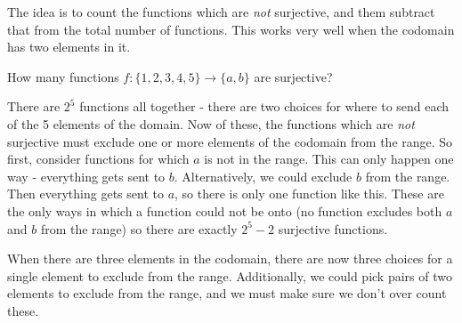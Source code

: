 \documentclass[12pt]{article}
\begin{document}
The idea is to count the functions which are {\em not} surjective, and them subtract that from the total number of functions.  This works very well when the codomain has two elements in it.

\begin{example}
  How many functions $f: \{1,2,3,4,5\} \to \{a,b\}$ are surjective?
  \begin{solution}
    There are $2^5$ functions all together - there are two choices for where to send each of the 5 elements of the domain.  Now of these, the functions which are {\em not} surjective must exclude one or more elements of the codomain from the range.  So first, consider functions for which $a$ is not in the range.  This can only happen one way - everything gets sent to $b$.  Alternatively, we could exclude $b$ from the range.  Then everything gets sent to $a$, so there is only one function like this.  These are the only ways in which a function could not be onto (no function excludes both $a$ and $b$ from the range) so there are exactly $2^5 - 2$ surjective functions.
  \end{solution}
\end{example}

When there are three elements in the codomain, there are now three choices for a single element to exclude from the range.  Additionally, we could pick pairs of two elements to exclude from the range, and we must make sure we don't over count these.
\end{document}
